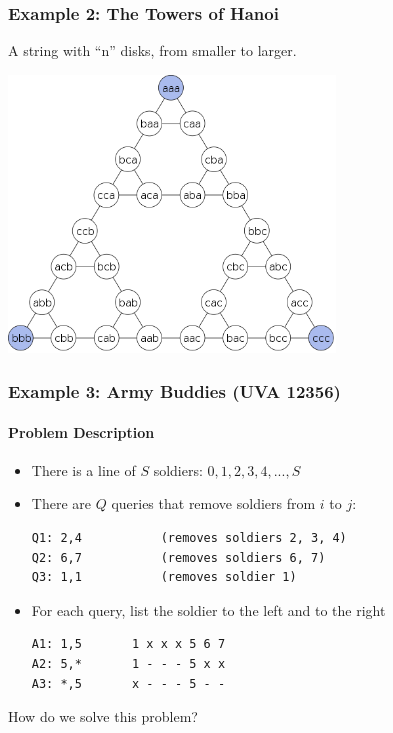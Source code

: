 \begin{frame}
  \frametitle{Example 2: The Towers of Hanoi}
  A string with ``n'' disks, from smaller to larger.
  \begin{center}
    \includegraphics[width=0.65\textwidth]{img/hanoi_graph}
  \end{center}
\end{frame}

\begin{frame}[fragile]
  \frametitle{Example 3: Army Buddies (UVA 12356)}
  \framesubtitle{Problem Description}

  \begin{block}{}
    \begin{itemize}
    \item There is a line of $S$ soldiers: $0,1,2,3,4,...,S$
    \item There are $Q$ queries that remove soldiers from $i$ to $j$:
\begin{verbatim}
Q1: 2,4           (removes soldiers 2, 3, 4)
Q2: 6,7           (removes soldiers 6, 7)
Q3: 1,1           (removes soldier 1)
\end{verbatim}
    \item For each query, list the soldier to the \alert{left} and to the \alert{right}
\begin{verbatim}
A1: 1,5       1 x x x 5 6 7
A2: 5,*       1 - - - 5 x x
A3: *,5       x - - - 5 - -
\end{verbatim}
    \end{itemize}
  \end{block}

  \bigskip

  How do we solve this problem?
\end{frame}


